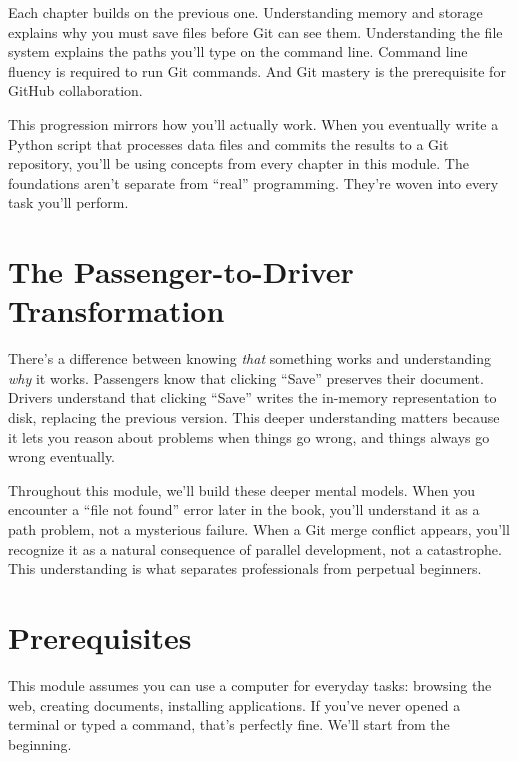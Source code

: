 \documentclass[
  letterpaper,
  DIV=11,
  numbers=noendperiod]{scrreprt}
\begin{document}

Each chapter builds on the previous one. Understanding memory and
storage explains why you must save files before Git can see them.
Understanding the file system explains the paths you'll type on the
command line. Command line fluency is required to run Git commands. And
Git mastery is the prerequisite for GitHub collaboration.

This progression mirrors how you'll actually work. When you eventually
write a Python script that processes data files and commits the results
to a Git repository, you'll be using concepts from every chapter in this
module. The foundations aren't separate from ``real'' programming.
They're woven into every task you'll perform.

\section*{The Passenger-to-Driver
Transformation}\label{the-passenger-to-driver-transformation}


There's a difference between knowing \emph{that} something works and
understanding \emph{why} it works. Passengers know that clicking
``Save'' preserves their document. Drivers understand that clicking
``Save'' writes the in-memory representation to disk, replacing the
previous version. This deeper understanding matters because it lets you
reason about problems when things go wrong, and things always go wrong
eventually.

Throughout this module, we'll build these deeper mental models. When you
encounter a ``file not found'' error later in the book, you'll
understand it as a path problem, not a mysterious failure. When a Git
merge conflict appears, you'll recognize it as a natural consequence of
parallel development, not a catastrophe. This understanding is what
separates professionals from perpetual beginners.

\section*{Prerequisites}\label{prerequisites-1}


This module assumes you can use a computer for everyday tasks: browsing
the web, creating documents, installing applications. If you've never
opened a terminal or typed a command, that's perfectly fine. We'll start
from the beginning.
\end{document}
